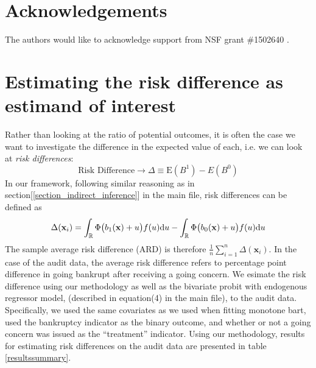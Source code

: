 \documentclass[aoas,preprint, 11pt, dvipsnames, table, x11name]{imsart}
\newcommand{\E}{\mbox{E}}
\theoremstyle{remark}
\begin{document}
	
	
	
	
	
	
	
	
	
	
	
	
	\section*{Acknowledgements}
	The authors would like to acknowledge support from NSF grant \#1502640 .
	
	\clearpage
	\appendix
	\section{Estimating the risk difference as estimand of interest}\label{4.4}
	Rather than looking at the ratio of potential outcomes, it is often the case we want to investigate the difference in the expected value of each, i.e. we can look at \emph{risk differences}:
	\[\text{Risk Difference}\rightarrow \Delta \equiv \E(B^1)-E(B^0)\]
	In our framework, following similar reasoning as in section[\ref{section_indirect_inference}] in the main file,  risk differences can be defined as 
	\[\Delta(\mathbf{x}_i)=\int_{\mathbb{R}} \Phi\qty(b_1(\mathbf{x})+u)f(u)\dd u - \int_{\mathbb{R}} \Phi\qty(b_0(\mathbf{x})+u) f(u)\dd u\]
	The sample average risk difference (ARD) is therefore $\frac{1}{n}\sum_{i=1}^{n}\Delta(\mathbf{x}_i)$. In the case of the audit data, the average risk difference refers to percentage point difference in going bankrupt after receiving a going concern. We esimate the risk difference using our methodology as well as the bivariate probit with endogenous regressor model, (described in equation(4) in the main file), to the audit data.  Specifically, we used the same covariates as we used when fitting monotone bart, used the bankruptcy indicator as the binary outcome, and whether or not a going concern was issued as the ``treatment'' indicator.  Using our methodology, results for estimating risk differences on the audit data are presented in table \ref{resultssummary}.
	
\end{document}
